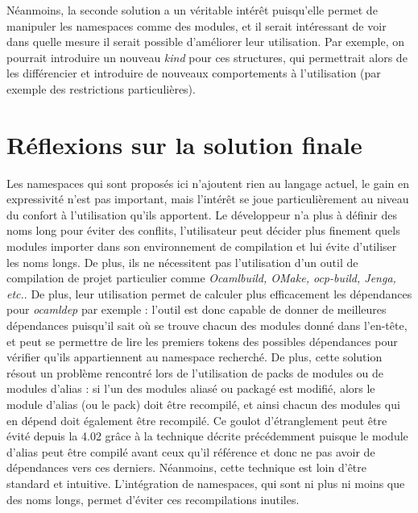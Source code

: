 \documentclass[11pt,a4paper]{report}
\begin{document}
Néanmoins, la seconde solution a un véritable intérêt puisqu'elle permet de
manipuler les namespaces comme des modules, et il serait intéressant de voir
dans quelle mesure il serait possible d'améliorer leur utilisation. Par exemple,
on pourrait introduire un nouveau \emph{kind} pour ces structures, qui
permettrait alors de les différencier et introduire de nouveaux comportements à
l'utilisation (par exemple des restrictions particulières).

\section{Réflexions sur la solution finale}

Les namespaces qui sont proposés ici n'ajoutent rien au langage actuel, le gain
en expressivité n'est pas important, mais l'intérêt se joue particulièrement au
niveau du confort à l'utilisation qu'ils apportent. Le développeur n'a plus à
définir des noms long pour éviter des conflits, l'utilisateur peut décider plus
finement quels modules importer dans son environnement de compilation et lui
évite d'utiliser les noms longs. De plus, ils ne nécessitent pas l'utilisation
d'un outil de compilation de projet particulier comme \emph{Ocamlbuild, OMake,
  ocp-build, Jenga, etc.}. De plus, leur utilisation permet de calculer plus
efficacement les dépendances pour \emph{ocamldep} par exemple : l'outil est donc
capable de donner de meilleures dépendances puisqu'il sait où se trouve chacun
des modules donné dans l'en-tête, et peut se permettre de lire les premiers
tokens des possibles dépendances pour vérifier qu'ils appartiennent au namespace
recherché. De plus, cette solution résout un problème rencontré lors de
l'utilisation de packs de modules ou de modules d'alias : si l'un des modules
aliasé ou packagé est modifié, alors le module d'alias (ou le pack) doit être
recompilé, et ainsi chacun des modules qui en dépend doit également être
recompilé. Ce goulot d'étranglement peut être évité depuis la 4.02 grâce à la
technique décrite précédemment puisque le module d'alias peut être compilé avant
ceux qu'il référence et donc ne pas avoir de dépendances vers ces
derniers. Néanmoins, cette technique est loin d'être standard et
intuitive. L'intégration de namespaces, qui sont ni plus ni moins que des noms
longs, permet d'éviter ces recompilations inutiles.
\end{document}
